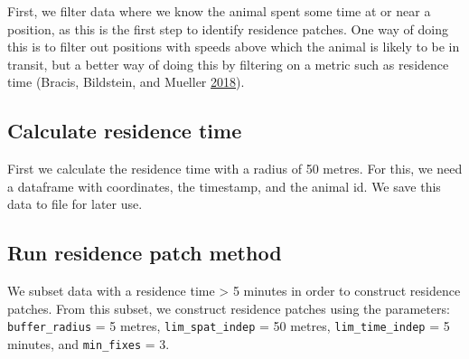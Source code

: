\documentclass[]{scrreprt}
\newenvironment{Shaded}{}{}
\newcommand{\CommentTok}[1]{\textcolor[rgb]{0.00,0.50,0.00}{#1}}
\newcommand{\DataTypeTok}[1]{#1}
\newcommand{\DecValTok}[1]{#1}
\newcommand{\ErrorTok}[1]{\textcolor[rgb]{1.00,0.00,0.00}{\textbf{#1}}}
\newcommand{\KeywordTok}[1]{\textcolor[rgb]{0.00,0.00,1.00}{#1}}
\newcommand{\NormalTok}[1]{#1}
\newcommand{\OperatorTok}[1]{#1}
\newcommand{\StringTok}[1]{\textcolor[rgb]{0.00,0.50,0.50}{#1}}
\begin{document}
First, we filter data where we know the animal spent some time at or near a position, as this is the first step to identify residence patches.
One way of doing this is to filter out positions with speeds above which the animal is likely to be in transit, but a better way of doing this by filtering on a metric such as residence time (Bracis, Bildstein, and Mueller \protect\hyperlink{ref-bracis2018}{2018}).

\hypertarget{calculate-residence-time}{%
\subsection{Calculate residence time}\label{calculate-residence-time}}

First we calculate the residence time with a radius of 50 metres.
For this, we need a dataframe with coordinates, the timestamp, and the animal id.
We save this data to file for later use.

\begin{Shaded}
\end{Shaded}

\hypertarget{run-residence-patch-method}{%
\subsection{Run residence patch method}\label{run-residence-patch-method}}

We subset data with a residence time \textgreater{} 5 minutes in order to construct residence patches.
From this subset, we construct residence patches using the parameters: \texttt{buffer\_radius} = 5 metres, \texttt{lim\_spat\_indep} = 50 metres, \texttt{lim\_time\_indep} = 5 minutes, and \texttt{min\_fixes} = 3.
\end{document}

